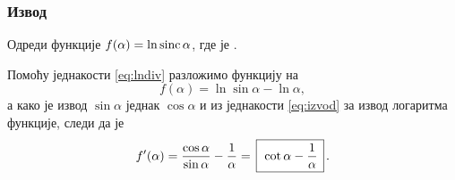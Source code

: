\subsubsection{Извод}

\def\sinc{\mathop{\rm sinc}}
\zadatak Одреди  функције $f(\alpha)=\ln\sinc\alpha$, где је
\smash{$\displaystyle{\sinc\alpha=\frac{\sin\alpha}{\alpha}}$}.

\resenje Помоћу једнакости \eqref{eq:lndiv} разложимо функцију на 
$$f(\alpha)=\ln\sin\alpha-\ln\alpha,$$ 
а како је извод $\sin\alpha$ једнак $\cos\alpha$ и из једнакости 
\eqref{eq:izvod} за извод логаритма функције, следи да је
$$
f'(\alpha)
=\frac{\cos\alpha}{\sin\alpha} - \frac1\alpha
=\ram{\cot\alpha - \frac1\alpha}.
$$
